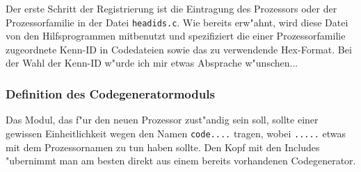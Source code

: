 \documentclass[12pt,a4paper,twoside]{report}
\newcommand{\tty}[1]{{\tt #1}}
\begin{document}
Der erste Schritt der Registrierung ist die Eintragung des Prozessors oder
der Prozessorfamilie in der Datei {\tt headids.c}.  Wie bereits erw"ahnt,
wird diese Datei von den Hilfsprogrammen mitbenutzt und spezifiziert die
einer Prozessorfamilie zugeordnete Kenn-ID in Codedateien sowie das zu
verwendende Hex-Format.  Bei der Wahl der Kenn-ID w"urde ich mir etwas
Absprache w"unschen...

\subsubsection{Definition des Codegeneratormoduls}

Das Modul, das f"ur den neuen Prozessor zust"andig sein soll, sollte einer
gewissen Einheitlichkeit wegen den Namen \tty{code....} tragen, wobei
\tty{.....} etwas mit dem Prozessornamen zu tun haben sollte.  Den Kopf
mit den Includes "ubernimmt man am besten direkt aus einem bereits
vorhandenen Codegenerator.
\end{document}
